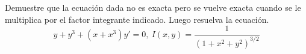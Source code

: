 \item Demuestre que la ecuación dada no es exacta pero se vuelve exacta cuando se le multiplica por el factor integrante indicado. Luego resuelva la ecuación.
    \[ y + y^3 + (x + x^3)y' = 0, \ I(x, y) = \frac{1}{(1 + x^2 + y^2)^{3/2}} \]
